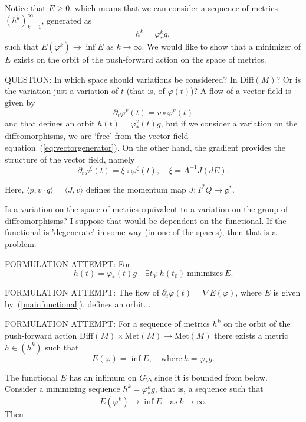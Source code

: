\documentclass[a5paper,11pt,twoside]{article}
\theoremstyle{plain}
\newcommand{\Diff}{\ensuremath{\mathrm{Diff}}}
\newcommand{\Met}{\ensuremath{\mathrm{Met}}}
\theoremstyle{definition}
\begin{document}
Notice that $E\geq 0$, which means that we can consider a sequence of metrics $(h^k)_{k=1}^\infty$, generated as
\[ h^k=\varphi^k_*g,\]
such that $E(\varphi^k)\to \inf E$ as $k\to\infty$. We would like to show that a minimizer of $E$ exists on the orbit of the push-forward action on the space of metrics.

QUESTION: In which space should variations be considered? In $\Diff(M)$? Or is the variation just a variation of $t$ (that is, of $\varphi(t)$)? A flow of a vector field is given by 
%
\begin{equation} 
\label{eq:vectorgenerator}
\partial_t\varphi^v(t)=v\circ\varphi^v(t)
\end{equation}
%
and that defines an orbit $h(t)=\varphi^v_*(t)g$, but if we consider a variation on the diffeomorphisms, we are `free' from the vector field equation~(\ref{eq:vectorgenerator}).  On the other hand, the gradient provides the structure of the vector field, namely
\[
\partial_t\varphi^\xi(t)=\xi\circ\varphi^\xi(t),\quad \xi=A^{-1}J(dE).
\]

Here, $\langle p,v\cdot q\rangle=\langle J,v\rangle$ defines the momentum map $J:T^*Q\to\mathfrak g^*$.

Is a variation on the space of metrics equivalent to a variation on the group of diffeomorphisms? I suppose that would be dependent on the functional. If the functional is 'degenerate' in some way (in one of the spaces), then that is a problem.

FORMULATION ATTEMPT: For
\[
h(t)=\varphi_*(t)g\quad \exists t_0 : h(t_0)\mathrm{\ minimizes\ }E.
\]

FORMULATION ATTEMPT: The flow of $\partial_t\varphi(t)=\nabla E(\varphi)$, where $E$ is given by~(\ref{mainfunctional}), defines an orbit...

FORMULATION ATTEMPT: For a sequence of metrics $h^k$ on the orbit of the push-forward action $\Diff(M)\times \Met(M)\to\Met(M)$ there exists a metric $h\in(h^k)$ such that 
\[
E(\varphi)=\inf E,\quad \mathrm{where\ } h=\varphi_*g.
\]

The functional $E$ has an infimum on $G_V$, since it is bounded from below.
Consider a minimizing sequence $h^k=\varphi^k_*g$, that is, a sequence such that \[E(\varphi^k)\to\inf E\quad\mathrm{as}\ k\to\infty.\]
Then
\end{document}
